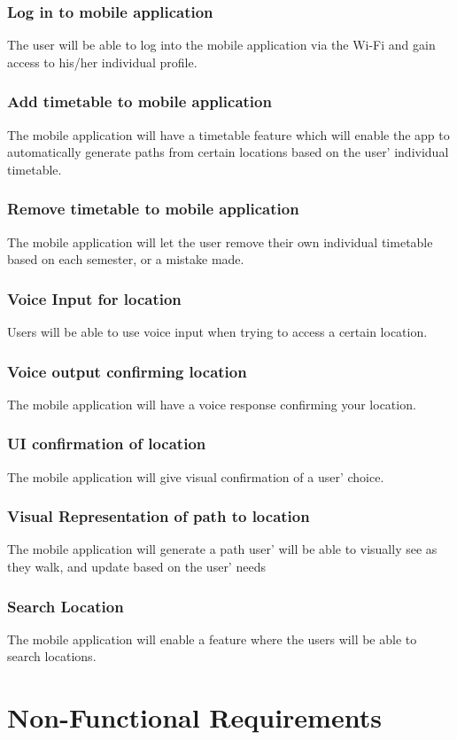 \documentclass{article}
\begin{document}
\subsubsection{Log in to mobile application}
The user will be able to log into the mobile application via the Wi-Fi and gain access to his/her individual profile.
\subsubsection{Add timetable to mobile application}
The mobile application will have a timetable feature which will enable the app to automatically generate paths from certain locations based on the user' individual timetable. 
\subsubsection{Remove timetable to mobile application}
The mobile application will let the user remove their own individual timetable based on each semester, or a mistake made.
\subsubsection{Voice Input for location}
Users will be able to use voice input when trying to access a certain location.
\subsubsection{Voice output confirming location}
The mobile application will have a voice response confirming your location.
\subsubsection{UI confirmation of location}
The mobile application will give visual confirmation of a user' choice.
\subsubsection{Visual Representation of path to location}
The mobile application will generate a path user' will be able to visually see as they walk, and update based on the user' needs
\subsubsection{Search Location}
The mobile application will enable a feature where the users will be able to search locations.

\newpage
\centering
\section{Non-Functional Requirements}
 
\end{document}
